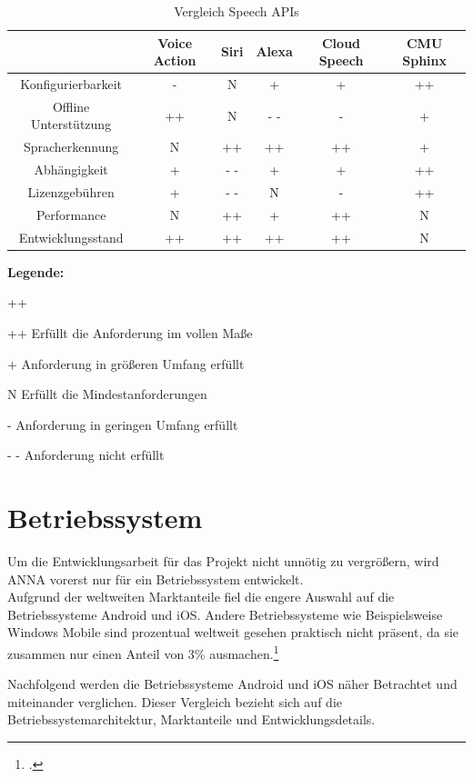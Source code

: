 \begin{table}[h]
\centering
\begin{tabular}{ |c|c|c|c|c|c| } 
 \hline
 & Voice Action & Siri & Alexa & Cloud Speech & CMU Sphinx \\
 \hline
 Konfigurierbarkeit & - & N & + & + & ++ \\
 Offline Unterstützung  & ++ & N & - - & - & + \\
 Spracherkennung & N & ++ & ++ & ++ & + \\
 Abhängigkeit & + & - - & + & + & ++ \\
 Lizenzgebühren & + & - - & N & - & ++ \\
 Performance & N & ++ & + & ++ & N\\
 Entwicklungsstand & ++ & ++ & ++ & ++ & N\\
 \hline
\end{tabular}
\par\medskip 
\scriptsize\textbf{Legende:}\begin{labeling}[:]{++}
\item[++] Erfüllt die Anforderung im vollen Maße 
\item[+] Anforderung in größeren Umfang erfüllt
\item[N] Erfüllt die Mindestanforderungen
\item[-] Anforderung in geringen Umfang erfüllt
\item[- -] Anforderung nicht erfüllt
\end{labeling}
\caption{Vergleich Speech APIs}
\label{tabSpeechAPIs}
\end{table}

\newpage
\section{Betriebssystem}
Um die Entwicklungsarbeit für das Projekt nicht unnötig zu vergrößern, wird \ac{ANNA} vorerst nur für ein Betriebssystem entwickelt.\\
Aufgrund der weltweiten Marktanteile fiel die engere Auswahl auf die Betriebssysteme Android und iOS. Andere Betriebssysteme wie Beispielsweise Windows Mobile sind prozentual weltweit gesehen praktisch nicht präsent, da sie zusammen nur einen Anteil von 3\% ausmachen.\footcite[vgl.:][]{androidVSios}

Nachfolgend werden die Betriebssysteme Android und iOS näher Betrachtet und miteinander verglichen. Dieser Vergleich bezieht sich auf die Betriebssystemarchitektur, Marktanteile und Entwicklungsdetails.

